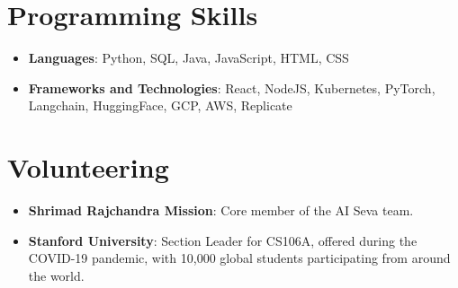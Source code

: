 \documentclass[letterpaper,11pt]{article}
\newcommand{\resumeItem}[2]{
  \item\small{
    \textbf{#1}{: #2 \vspace{-2pt}}
  }
}
\newcommand{\resumeSubHeadingListStart}{\begin{itemize}[leftmargin=*]}
\newcommand{\resumeSubHeadingListEnd}{\end{itemize}}
\begin{document}
\section{Programming Skills}
  \resumeSubHeadingListStart
   \item{
     \textbf{Languages}{: Python, SQL, Java, JavaScript, HTML, CSS}
      }
      \item{
       \textbf{Frameworks and Technologies}{: React, NodeJS, Kubernetes, PyTorch, Langchain, HuggingFace, GCP, AWS, Replicate}
    }
  \resumeSubHeadingListEnd

\section{Volunteering}
\resumeSubHeadingListStart
\resumeItem{Shrimad Rajchandra Mission}{Core member of the AI Seva team.}
\resumeItem{Stanford University}{Section Leader for CS106A, offered during the COVID-19 pandemic, with 10,000 global students participating from around the world.}
\iffalse
\resumeItem{Google}{Organized the Google AI Explore ML Workshop at SSN College of Engineering.}
\fi
\resumeSubHeadingListEnd
\iffalse
\section{Blog}
I also run a blog which you can find at \href{https://rohitmidha23.github.io/blog}{rohitmidha23.github.io/blog}. It has had over 30k page views.
\fi
\end{document}
